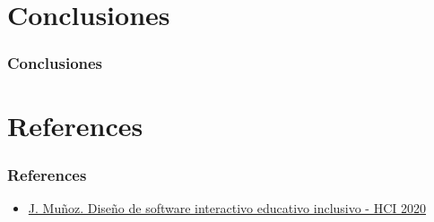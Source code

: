 \documentclass[11pt]{beamer}
\begin{document}
\section{Conclusiones}
\begin{frame}
\frametitle{Conclusiones}
\end{frame}

\section{References}
\begin{frame}
\frametitle{References}
\begin{itemize}
\item \href{https://www.youtube.com/watch?v=F0nOl4GRfC4&t=1577s}{J. Muñoz. Diseño de software interactivo educativo inclusivo - HCI 2020}
\end{itemize}
\end{frame}
\end{document}
